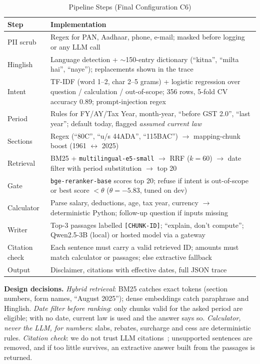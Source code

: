 \documentclass[conference]{IEEEtran}
\begin{document}
\begin{table}[t]
\caption{Pipeline Steps (Final Configuration C6)}
\label{tab:steps}
\centering
\footnotesize
\begin{tabular}{@{}p{}p{}@{}}
\toprule
Step & Implementation \\
\midrule
PII scrub & Regex for PAN, Aadhaar, phone, e-mail; masked before logging or any LLM call \\
Hinglish & Language detection + $\sim$150-entry dictionary (``kitna'', ``milta hai'', ``naye''); replacements shown in the trace \\
Intent & TF-IDF (word 1--2, char 2--5 grams) + logistic regression over question / calculation / out-of-scope; 356 rows, 5-fold CV accuracy 0.89; prompt-injection regex \\
Period & Rules for FY/AY/Tax Year, month-year, ``before GST 2.0'', ``last year''; default today, flagged \emph{assumed current law} \\
Sections & Regex (``80C'', ``u/s 44ADA'', ``115BAC'') $\to$ mapping-chunk boost (1961 $\leftrightarrow$ 2025) \\
Retrieval & BM25 + \texttt{multilingual-e5-small} $\to$ RRF ($k{=}60$) $\to$ date filter with period substitution $\to$ top 20 \\
Gate & \texttt{bge-reranker-base} scores top 20; refuse if intent is out-of-scope or best score $<\theta$ ($\theta{=}{-}5.83$, tuned on dev) \\
Calculator & Parse salary, deductions, age, tax year, currency $\to$ deterministic Python; follow-up question if inputs missing \\
Writer & Top-3 passages labelled \texttt{[CHUNK-ID]}; ``explain, don't compute''; Qwen2.5-3B (local) or hosted model via a gateway \\
Citation check & Each sentence must carry a valid retrieved ID; amounts must match calculator or passages; else extractive fallback \\
Output & Disclaimer, citations with effective dates, full JSON trace \\
\bottomrule
\end{tabular}
\end{table}

\textbf{Design decisions.} \emph{Hybrid retrieval}: BM25 catches exact tokens (section numbers, form names,
``August 2025''); dense embeddings catch paraphrase and Hinglish. \emph{Date filter before ranking}: only
chunks valid for the asked period are eligible; with no date, current law is used and the answer says so.
\emph{Calculator, never the LLM, for numbers}: slabs, rebates, surcharge and cess are deterministic rules.
\emph{Citation check}: we do not trust LLM citations~\cite{gao2023alce}; unsupported sentences are removed,
and if too little survives, an extractive answer built from the passages is returned.
\end{document}

